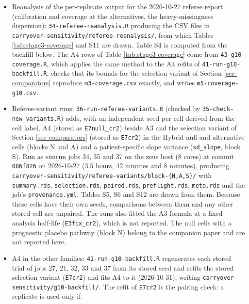 \documentclass[
  11pt,
]{article}
\begin{document}
\begin{itemize}
  the cross-factor constant correction and the stop-on-non-PD default
  are in \texttt{simulation-core.R} and \texttt{implementations/tidyverse/R/functions.R}.
\item
  Reanalysis of the per-replicate output for the 2026-10-27 referee
  report (calibration and coverage at the alternatives, the
  heavy-missingness dispersion): \texttt{34-referee-reanalysis.R} producing
  the CSV files in \texttt{carryover-sensitivity/referee-reanalysis/}, from
  which Tables \ref{tab:stage3-coverage} and S11 are drawn. Table S4
  is computed from the backfill below.
  The A4 rows of Table \ref{tab:stage3-coverage} come from
  \texttt{43-g10-coverage.R}, which applies the same method to the A4 refits
  of \texttt{41-run-g10-backfill.R}, checks that its bounds for the selection
  variant of Section \ref{sec-comparators} reproduce
  \texttt{m3-coverage.csv} exactly, and writes \texttt{m5-coverage-g10.csv}.
\item
  Referee-variant runs: \texttt{36-run-referee-variants.R} (checked by
  \texttt{35-check-new-variants.R}) adds, with an independent seed per cell
  derived from the cell label, A4 (stored as \texttt{E7null\_cr2}) beside A3
  and the selection variant of Section \ref{sec-comparators} (stored
  as \texttt{E7cr2}) in the Hybrid null and alternative cells (blocks N and A)
  and a patient-specific slope variance (\texttt{sd\_slope}, block S). Run as
  simrun jobs 34, 35 and 37 on the zeus host (8 cores) at commit
  \texttt{086f826} on 2026-10-27 (3.5 hours, 42 minutes and 8 minutes),
  producing \texttt{carryover-sensitivity/referee-variants/block-\{N,A,S\}/}
  with \texttt{summary.rds}, \texttt{selection.rds}, \texttt{paired.rds}, \texttt{preflight.rds},
  \texttt{meta.rds} and the job's \texttt{provenance.yml}. Tables
  S5, S6 and
  S12 are drawn from them. Because these cells
  have their own seeds, comparisons between them and any other stored
  cell are unpaired. The runs also fitted the A3 formula at a fixed
  analysis half-life (\texttt{E3fix\_cr2}), which is not reported. The null
  cells
  with a prognostic placebo pathway (block N) belong to the companion
  paper and are not reported here.
\item
  A4 in the other families: \texttt{41-run-g10-backfill.R} regenerates each
  stored trial of jobs 27, 21, 32, 33 and 37 from its stored seed and
  refits the stored selection variant (\texttt{E7cr2}) and fits A4 to it
  (2026-10-31), writing \texttt{carryover-sensitivity/g10-backfill/}. The
  refit of \texttt{E7cr2} is the pairing check: a replicate is used only if

\end{itemize}
\end{document}
